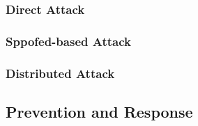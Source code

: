 \subsubsection{Direct Attack}
\label{subsec:SYNDirectAttack}

\subsubsection{Sppofed-based Attack}
\label{subsec:SYNSpoofedAttack}

\subsubsection{Distributed Attack}
\label{subsec:SYNDistributedAttack}

\subsection{Prevention and Response}
